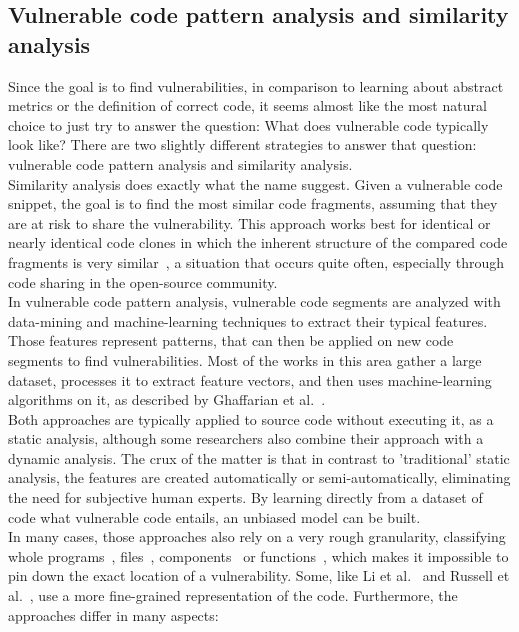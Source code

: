 \documentclass[
a4paper,
pagesize,
pdftex,
12pt,
twoside, %
BCOR=5mm, %
ngerman,
fleqn,
final,
]{scrartcl}
\begin{document}
	\subsection{Vulnerable code pattern analysis and similarity analysis}
	Since the goal is to find vulnerabilities, in comparison to learning about abstract metrics or the definition of correct code, it seems almost like the most natural choice to just try to answer the question: What does vulnerable code typically look like? There are two slightly different strategies to answer that question: vulnerable code pattern analysis and similarity analysis.\\
	Similarity analysis does exactly what the name suggest. Given a vulnerable code snippet, the goal is to find the most similar code fragments, assuming that they are at risk to share the vulnerability. This approach works best for identical or nearly identical code clones in which the inherent structure of the compared code fragments is very similar~\cite{Li.2018}, a situation that occurs quite often, especially through code sharing in the open-source community.\\
	In vulnerable code pattern analysis, vulnerable code segments are analyzed with data-mining and machine-learning techniques to extract their typical features. Those features represent patterns, that can then be applied on new code segments to find vulnerabilities. Most of the works in this area gather a large dataset, processes it to extract feature vectors, and then uses machine-learning algorithms on it, as described by Ghaffarian et al.~\cite{Ghaffarian.2017}.\\
	Both approaches are typically applied to source code without executing it, as a static analysis, although some researchers also combine their approach with a dynamic analysis. The crux of the matter is that in contrast to 'traditional' static analysis, the features are created automatically or semi-automatically, eliminating the need for subjective human experts. By learning directly from a dataset of code what vulnerable code entails, an unbiased model can be built.\\	
	In many cases, those approaches also rely on a very rough granularity, classifying whole programs~\cite{Grieco.2016}, files~\cite{Shin.2010}, components~\cite{Neuhaus.2007} or functions~\cite{Yamaguchi.2011}, which makes it impossible to pin down the exact location of a vulnerability. Some, like Li et al.~\cite{Li.2018} and Russell et al.~\cite{Russell.2018}, use a more fine-grained representation of the code. Furthermore, the approaches differ in many aspects:
\end{document}
